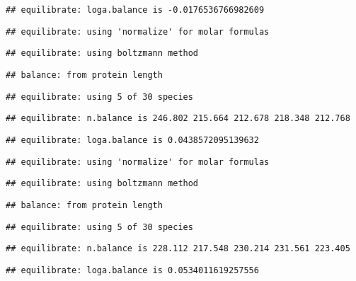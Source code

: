 \documentclass[]{article}
\begin{document}
\begin{verbatim}
## equilibrate: loga.balance is -0.0176536766982609
\end{verbatim}

\begin{verbatim}
## equilibrate: using 'normalize' for molar formulas
\end{verbatim}

\begin{verbatim}
## equilibrate: using boltzmann method
\end{verbatim}

\begin{verbatim}
## balance: from protein length
\end{verbatim}

\begin{verbatim}
## equilibrate: using 5 of 30 species
\end{verbatim}

\begin{verbatim}
## equilibrate: n.balance is 246.802 215.664 212.678 218.348 212.768
\end{verbatim}

\begin{verbatim}
## equilibrate: loga.balance is 0.0438572095139632
\end{verbatim}

\begin{verbatim}
## equilibrate: using 'normalize' for molar formulas
\end{verbatim}

\begin{verbatim}
## equilibrate: using boltzmann method
\end{verbatim}

\begin{verbatim}
## balance: from protein length
\end{verbatim}

\begin{verbatim}
## equilibrate: using 5 of 30 species
\end{verbatim}

\begin{verbatim}
## equilibrate: n.balance is 228.112 217.548 230.214 231.561 223.405
\end{verbatim}

\begin{verbatim}
## equilibrate: loga.balance is 0.0534011619257556
\end{verbatim}
\end{document}

